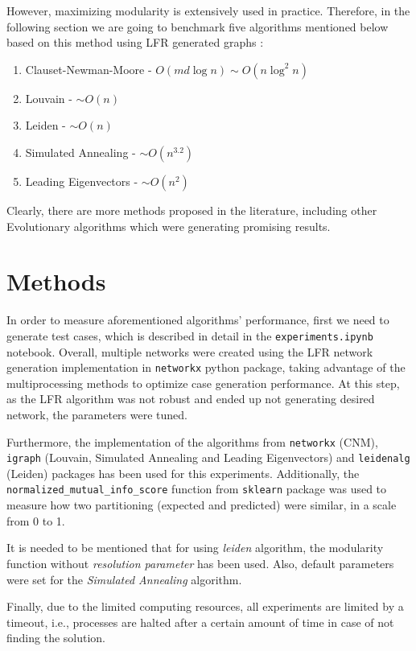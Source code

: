 \documentclass[11pt,a4paper]{article}
\begin{document}
However, maximizing modularity is extensively used in practice. Therefore, in the following section we are going to benchmark five algorithms mentioned below based on this method using LFR generated graphs \cite{LFR}:
\begin{enumerate}
	\item Clauset-Newman-Moore - $O(md \log n) \sim O(n \log^2 n)$ \cite{CNM}
	\item Louvain - $\sim O(n)$ \cite{louvain}
	\item Leiden - $\sim O(n)$ \cite{leiden}
	\item Simulated Annealing - $\sim O(n^{3.2})$\cite{simann, simulanncom}
	\item Leading Eigenvectors - $\sim O(n^2)$ \cite{eigen}
\end{enumerate}

Clearly, there are more methods proposed in the literature, including other Evolutionary algorithms \cite{mga, eamod, genealg} which were generating promising results.

\section{Methods}
In order to measure aforementioned algorithms' performance, first we need to generate test cases, which is described in detail in the \verb|experiments.ipynb| notebook. Overall, multiple networks were created using the LFR network generation implementation in \verb|networkx| python package, taking advantage of the multiprocessing methods to optimize case generation performance. At this step, as the LFR algorithm was not robust \cite{networkxLFR} and ended up not generating desired network, the parameters were tuned.

Furthermore, the implementation of the algorithms from \verb|networkx| (CNM), \verb|igraph| (Louvain, Simulated Annealing and Leading Eigenvectors) and \verb|leidenalg| (Leiden) packages has been used for this experiments. Additionally, the \verb|normalized_mutual_info_score| function from \verb|sklearn| package was used to measure how two partitioning (expected and predicted) were similar, in a scale from 0 to 1.

It is needed to be mentioned that for using \textit{leiden} algorithm, the modularity function without \textit{resolution parameter} has been used. Also, default parameters were set for the \textit{Simulated Annealing} algorithm.

Finally, due to the limited computing resources, all experiments are limited by a timeout, i.e., processes are halted after a certain amount of time in case of not finding the solution.
\end{document}
